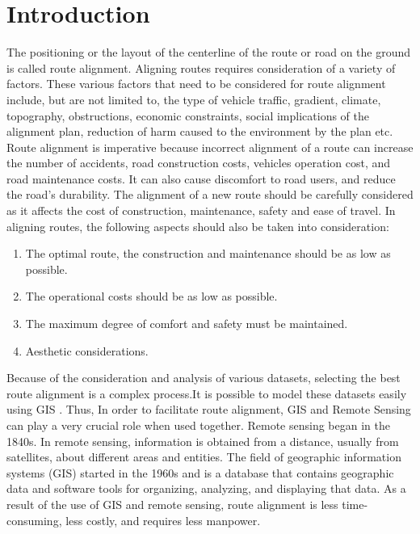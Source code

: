 %
\chapter{Introduction}

The positioning or the layout of the centerline of the route or road on the ground is called route alignment. Aligning routes requires consideration of a variety of factors. These various factors that need to be considered for route alignment include, but are not limited to, the type of vehicle traffic, gradient, climate, topography, obstructions, economic constraints, social implications of the alignment plan, reduction of harm caused to the environment by the plan etc. Route alignment is imperative because incorrect alignment of a route can increase the number of accidents, road construction costs, vehicles operation cost, and road maintenance costs. It can also cause discomfort to road users, and reduce the road's durability. The alignment of a new route should be carefully considered as it affects the cost of construction, maintenance, safety and ease of travel. In aligning routes, the following aspects should also be taken into consideration: 
\begin{enumerate}
    \item The optimal route, the construction and maintenance should be as low as possible.
    \item The operational costs should be as low as possible.
    \item The maximum degree of comfort and safety must be maintained.
    \item Aesthetic considerations.
\end{enumerate}


Because of the consideration and analysis of various datasets, selecting the best route alignment is a complex process.It is possible to model these datasets easily using GIS . Thus, In order to facilitate route alignment, GIS and Remote Sensing can play a very crucial role when used together. Remote sensing began in the 1840s. In remote sensing, information is obtained from a distance, usually from satellites, about different areas and entities. The field of geographic information systems (GIS) started in the 1960s and is a database that contains geographic data and software tools for organizing, analyzing, and displaying that data. As a result of the use of GIS and remote sensing, route alignment is less time-consuming, less costly, and requires less manpower. 


